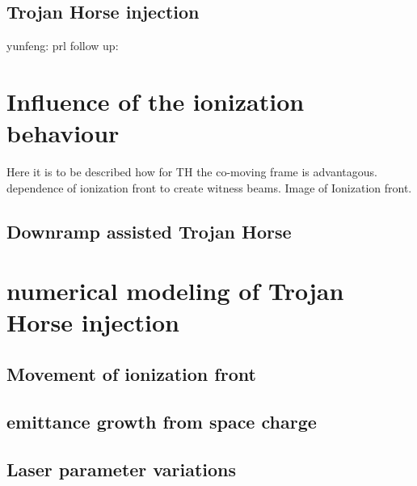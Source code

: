 
\subsection{Trojan Horse injection}
\label{sec:Theory_TrojanHorse}
\cite{Hidding_PRL_2012}
yunfeng: \cite{xi2013hybrid}
prl follow up: \cite{hidding2014ultrahigh}


\section{Influence of the ionization behaviour}
	Here it is to be described how for TH the co-moving frame is advantagous. dependence of ionization front to 
	create witness beams.
	Image of Ionization front.
	
	


	
\subsection{Downramp assisted Trojan Horse}

\section{numerical modeling of Trojan Horse injection}

\subsection{Movement of ionization front}
\subsection{emittance growth from space charge}
\subsection{Laser parameter variations}
	
